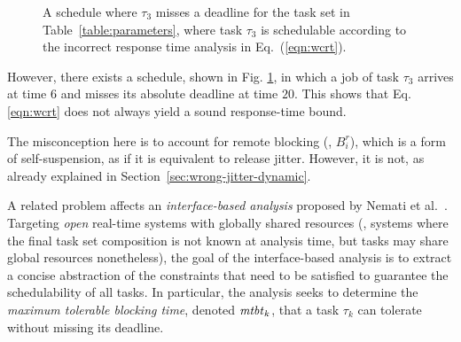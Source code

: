 \begin{figure}[t]
{}       
\caption{A schedule where $\tau_3$ misses a deadline for the task set in Table~\ref{table:parameters}, where  task $\tau_3$ is schedulable according to the incorrect
 response time analysis in Eq.~(\ref{eqn:wcrt}).}
\label{fig:counterexample_protocol}
\end{figure}

\ifpaper
 \fi

However, there exists a schedule, shown in Fig. \ref{fig:counterexample_protocol}, in which a job of task $\tau_3$ arrives at time $6$ and misses its absolute deadline at time $20$. This shows that Eq. \eqref{eqn:wcrt} does not always yield a sound response-time bound. 

The misconception here is to account for remote blocking (\ie, $B_i^r$), which is a form of self-suspension, as if it is equivalent to release jitter. However, it is not, as already explained in Section~\ref{sec:wrong-jitter-dynamic}.


A related problem affects an \emph{interface-based analysis}  proposed by Nemati et al.~\cite{NBN:11}. Targeting \emph{open} real-time systems with globally shared resources (\ie, systems where the final task set composition is not known at analysis time, but tasks may share global resources nonetheless), the goal of the interface-based analysis is to extract a concise abstraction of the constraints that need to be satisfied  to guarantee the schedulability of all tasks. In particular, the analysis seeks to determine the \emph{maximum tolerable blocking time}, denoted $\mathit{mtbt}_k$, that a task $\tau_k$ can tolerate without missing its deadline. 

